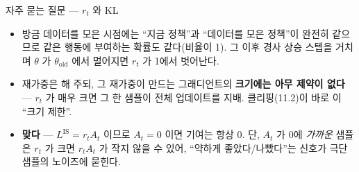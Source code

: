 \begin{frame}{자주 묻는 질문 — $r_t$ 와 KL}
  \small
  \begin{itemize}
    \item {} 방금 데이터를 모은 시점에는 ``지금 정책''과
      ``데이터를 모은 정책''이 완전히 같으므로 같은 행동에 부여하는
      확률도 같다(비율이 1). 그 이후 경사 상승 스텝을 거치며
      $\theta$ 가 $\theta_{\mathrm{old}}$ 에서 멀어지면 $r_t$ 가
      1에서 벗어난다.
    \item {} 재가중은
      해 주되, 그 재가중이 만드는 그래디언트의 \textbf{크기에는
      아무 제약이 없다} — $r_t$ 가 매우 크면 그 한 샘플이 전체
      업데이트를 지배. 클리핑(11.2)이 바로 이 ``크기 제한''.
    \item {}
      \textbf{맞다} — $L^{\mathrm{IS}}=r_tA_t$ 이므로 $A_t=0$ 이면
      기여는 항상 0. 단, $A_t$ 가 0에 \textit{가까운} 샘플은
      $r_t$ 가 크면 $r_tA_t$ 가 작지 않을 수 있어,
      ``약하게 좋았다/나빴다''는 신호가 극단 샘플의 노이즈에
      묻힌다.
  \end{itemize}
\end{frame}
